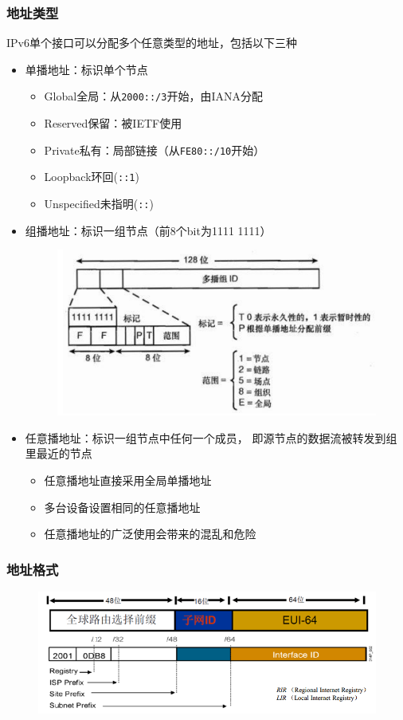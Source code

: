 \subsubsection{地址类型}
IPv6单个接口可以分配多个任意类型的地址，包括以下三种
\begin{itemize}
	\item 单播地址：标识单个节点
	\begin{itemize}
		\item Global全局：从\verb'2000::/3'开始，由IANA分配
		\item Reserved保留：被IETF使用
		\item Private私有：局部链接（从\verb'FE80::/10'开始）
		\item Loopback环回(\verb'::1')
		\item Unspecified未指明(\verb'::')
	\end{itemize}
	\item 组播地址：标识一组节点（前8个bit为1111 1111）
	\begin{figure}[H]
		\centering
		\includegraphics[width=0.5\linewidth]{fig/ipv6-group-broadcast.png}
	\end{figure}
	\item 任意播地址：标识一组节点中任何一个成员， 即源节点的数据流被转发到组里最近的节点
	\begin{itemize}
		\item 任意播地址直接采用全局单播地址
		\item 多台设备设置相同的任意播地址
		\item 任意播地址的广泛使用会带来的混乱和危险
	\end{itemize}
\end{itemize}

\subsubsection{地址格式}
\begin{figure}[H]
	\centering
	\includegraphics[width=0.8\linewidth]{fig/ipv6-network-prefix.png}
\end{figure}

